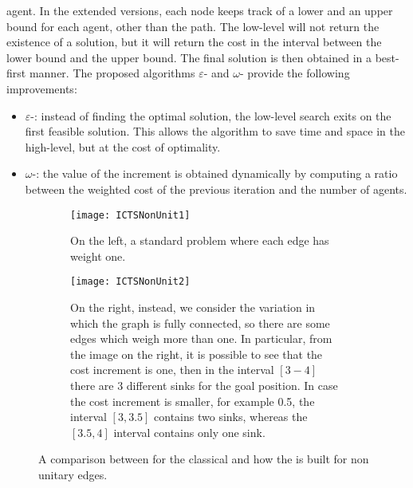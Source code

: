 agent. In the extended versions, each node keeps track of a lower and an upper
bound for each agent, other than the path. The low-level will not return the
existence of a solution, but it will return the cost in the interval between
the lower bound and the upper bound. The final solution is then obtained in a
best-first manner. \newline
The proposed algorithms $\varepsilon$- and $\omega$-
provide the following improvements:
\begin{itemize}
  \item $\varepsilon$-: instead of finding the optimal solution, the
    low-level search exits on the first feasible solution. This allows the
    algorithm to save time and space in the high-level, but at the cost of 
    optimality.
  \item $\omega$-: the value of the increment is obtained
    dynamically by computing a ratio between the weighted cost of the previous
    iteration and the number of agents.
\end{itemize}
\begin{figure}[htpb]
  \centering
  \begin{subfigure}[t]{0.49\linewidth}
    \centering
    \texttt{[image: ICTSNonUnit1]}
    \caption{On the left, a standard  problem where each edge has
      weight one.} 
  \end{subfigure}
  \hfill
  \begin{subfigure}[t]{0.49\linewidth}
    \centering
    \texttt{[image: ICTSNonUnit2]}
    \caption{On the right, instead, we consider the variation in which the
      graph is fully connected, so there are some edges which weigh more than
      one. In particular, from the image on the right, it is possible to see 
      that the cost increment is one, then in the interval $[3-4]$ there are 3 
      different sinks for the goal position. In case the cost increment is 
      smaller, for example 0.5, the interval $[3,3.5]$ contains two sinks, 
      whereas the $[3.5,4]$ interval contains only one sink.}
  \end{subfigure}
  \caption{A comparison between  for the classical  and
    how the  is built for non unitary edges.}
  \label{fig:eICTS}
\end{figure}
